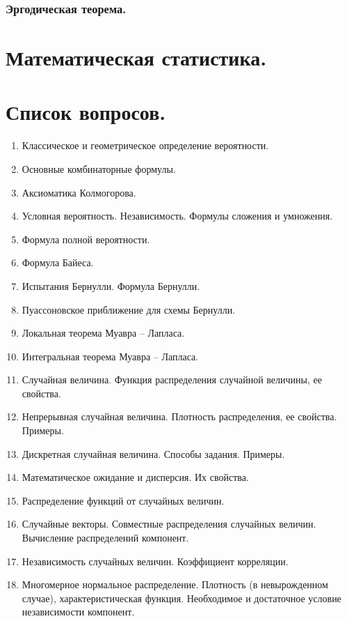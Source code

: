 \documentclass[14pt]{extarticle}
\theoremstyle{breakstyle}
\begin{document}
\subsubsection{Эргодическая теорема.}



\clearpage
\section{Математическая статистика.}



\clearpage
\section{Список вопросов.}

\begin{enumerate}[noitemsep, topsep=0pt]
    \item Классическое и геометрическое определение вероятности.
    \item Основные комбинаторные формулы.
    \item Аксиоматика Колмогорова.
    \item Условная вероятность. Независимость. Формулы сложения и умножения.
    \item Формула полной вероятности.
    \item Формула Байеса.
    \item Испытания Бернулли. Формула Бернулли.
    \item Пуассоновское приближение для схемы Бернулли.
    \item Локальная теорема Муавра – Лапласа.
    \item Интегральная теорема Муавра – Лапласа.
    \item Случайная величина. Функция распределения случайной величины, ее свойства.
    \item Непрерывная случайная величина. Плотность распределения, ее свойства. Примеры.
    \item Дискретная случайная величина. Способы задания. Примеры.
    \item Математическое ожидание и дисперсия. Их свойства.
    \item Распределение функций от случайных величин.
    \item Случайные векторы. Совместные распределения случайных величин. Вычисление распределений компонент.
    \item Независимость случайных величин. Коэффициент корреляции.
    \item Многомерное нормальное распределение. Плотность (в невырожденном случае), характеристическая функция. Необходимое и достаточное условие независимости компонент.

\end{enumerate}
\end{document}
